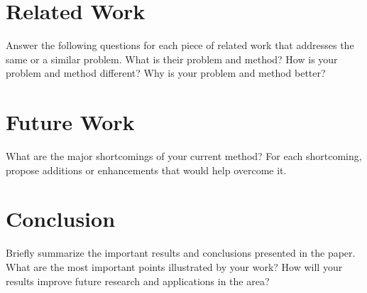 \documentclass{article}
\begin{document}
\section{Related Work}

Answer the following questions for each piece of related work that addresses the same or a similar problem. What is their problem and method? How is your problem and method different? Why is your problem and method better? 

\section{Future Work}

What are the major shortcomings of your current method? For each shortcoming, propose additions or enhancements that would help overcome it. 

\section{Conclusion}

Briefly summarize the important results and conclusions presented in the paper. What are the most important points illustrated by your work? How will your results improve future research and applications in the area? 




{}

\end{document}

